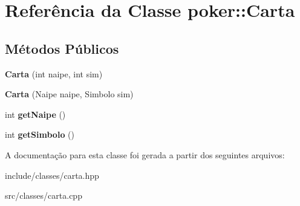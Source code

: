 \hypertarget{classpoker_1_1Carta}{}\section{Referência da Classe poker\+:\+:Carta}
\label{classpoker_1_1Carta}
\subsection*{Métodos Públicos}
\begin{DoxyCompactItemize}
\item 
\mbox{\label{classpoker_1_1Carta_a60073f91212ad8ec1b93bfa2e94d159e}} 
{\bfseries Carta} (int naipe, int sim)
\item 
\mbox{\label{classpoker_1_1Carta_a87042cacd975be1fb72d9aaca9e1b22b}} 
{\bfseries Carta} (Naipe naipe, Simbolo sim)
\item 
\mbox{\label{classpoker_1_1Carta_a2aee9e35373cc1982bb3c53e4df7e8b9}} 
int {\bfseries get\+Naipe} ()
\item 
\mbox{\label{classpoker_1_1Carta_a8e937319700a8a944b92bd1997794e9f}} 
int {\bfseries get\+Simbolo} ()
\end{DoxyCompactItemize}


A documentação para esta classe foi gerada a partir dos seguintes arquivos\+:\begin{DoxyCompactItemize}
\item 
include/classes/carta.\+hpp\item 
src/classes/carta.\+cpp\end{DoxyCompactItemize}
